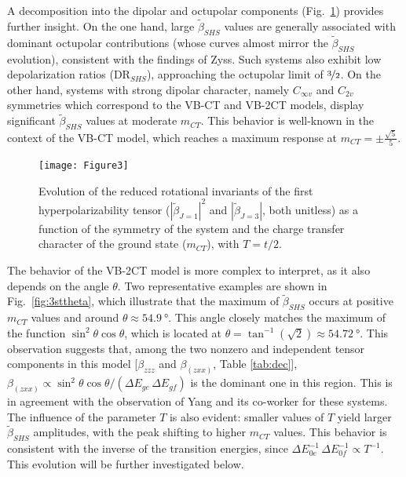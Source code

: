 \documentclass[journal=jpcafh]{achemso}
\begin{document}
A decomposition into the dipolar and octupolar components (Fig.~\ref{fig:betaJ}) provides further insight. On the one hand, large $\tilde\beta_{SHS}$ values are generally associated with dominant octupolar contributions (whose curves almost mirror the $\tilde\beta_{SHS}$ evolution), consistent with the findings of Zyss\cite{zyssMolecularEngineeringImplications1993}. Such systems also exhibit low depolarization ratios (DR$_{SHS}$), approaching the octupolar limit of $\nicefrac{3}{2}$. On the other hand, systems with strong dipolar character, namely $C_{\infty v}$ and $C_{2v}$ symmetries which correspond to the VB-CT and VB-2CT models, display significant $\tilde\beta_{SHS}$ values at moderate $m_{CT}$. This behavior is well-known in the context of the VB-CT model\cite{barzoukasTwostateDescriptionHyper1996}, which reaches a maximum response at $m_{CT} = \pm\frac{\sqrt{5}}{5}$.

\begin{figure}[!h]
\texttt{[image: Figure3]}
\caption{Evolution of the reduced rotational invariants of the first hyperpolarizability tensor ($|\tilde \beta_{J=1}|^2$ and $|\tilde \beta_{J=3}|$, both unitless) as a function of the symmetry of the system and the charge transfer character of the ground state ($m_{CT}$), with $T=t/2$.}
\label{fig:betaJ}
\end{figure}

The behavior of the VB-2CT model is more complex to interpret, as it also depends on the angle $\theta$. Two representative examples are shown in Fig.~\ref{fig:3sttheta}, which illustrate that the maximum of $\tilde\beta_{SHS}$ occurs at positive $m_{CT}$ values and around $\theta \approx \SI{54.9}{\degree}$. This angle closely matches the maximum of the function $\sin^2\theta\cos\theta$, which is located at $\theta = \tan^{-1}(\sqrt{2}) \approx \SI{54.72}{\degree}$. This observation suggests that, among the two nonzero and independent tensor components in this model [$\beta_{zzz}$ and $\beta_{(zxx)} $, Table \ref{tab:dec}], $\beta_{(zxx)} \propto \sin^2\theta\cos\theta / (\Delta E_{ge}\,\Delta E_{gf})$ is the dominant one in this region.  This is in agreement with the observation of Yang and its co-worker\cite{yangLargeOffDiagonalContribution2003} for these systems.
The influence of the parameter $T$ is also evident: smaller values of $T$ yield larger $\tilde\beta_{SHS}$ amplitudes, with the peak shifting to higher $m_{CT}$ values. This behavior is consistent with the inverse of the transition energies, since $\Delta E_{0e}^{-1}\,\Delta E_{0f}^{-1} \propto T^{-1}$. This evolution will be further investigated below.
\end{document}
